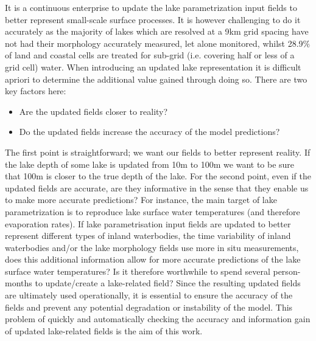 \documentclass[hess, twostagejnl]{copernicus}
\begin{document}
\noindent It is a continuous enterprise to update the lake parametrization input fields to better represent small-scale surface processes. It is however challenging to do it accurately as the majority of lakes which are resolved at a 9km grid spacing have not had their morphology accurately measured, let alone monitored, whilst 28.9$\%$ of land and coastal cells are treated for sub-grid (i.e. covering half or less of a grid cell) water. When introducing an updated lake representation it is difficult apriori to determine the additional value gained through doing so. There are two key factors here:
\begin{itemize}
	\item Are the updated fields closer to reality?
	\item Do the updated fields increase the accuracy of the model predictions?
\end{itemize}
The first point is straightforward; we want our fields to better represent reality. If the lake depth of some lake is updated from 10m to 100m we want to be sure that 100m is closer to the true depth of the lake. For the second point, even if the updated fields are accurate, are they informative in the sense that they enable us to make more accurate predictions? For instance, the main target of lake parametrization is to reproduce lake surface water temperatures (and therefore evaporation rates). If lake parametrisation input fields are updated to better represent different types of inland waterbodies, the time variability of inland waterbodies and/or the lake morphology fields use more in situ measurements, does this additional information allow for more accurate predictions of the lake surface water temperatures? Is it therefore worthwhile to spend several person-months to update/create a lake-related field? Since the resulting updated fields are ultimately used operationally, it is essential to ensure the accuracy of the fields and prevent any potential degradation or instability of the model. This problem of quickly and automatically checking the accuracy and information gain of updated lake-related fields is the aim of this work. \newline
\end{document}
